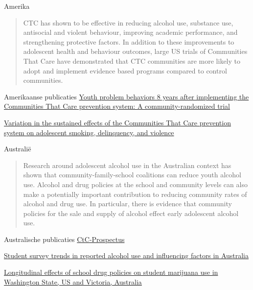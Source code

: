 \documentclass[
  ignorenonframetext,
]{beamer}
\begin{document}
\begin{frame}{Amerika}
\protect\hypertarget{amerika}{}
\begin{quote}
CTC has shown to be effective in reducing alcohol use, substance use,
antisocial and violent behaviour, improving academic performance, and
strengthening protective factors. In addition to these improvements to
adolescent health and behaviour outcomes, large US trials of Communities
That Care have demonstrated that CTC communities are more likely to
adopt and implement evidence based programs compared to control
communities.
\end{quote}
\end{frame}

\begin{frame}{Amerikaanse publicaties}
\protect\hypertarget{amerikaanse-publicaties}{}
\href{https://www.communitiesthatcare.org.au/sites/default/files/youth_problem_behaviors_8_years_after_implementing_the_communities_that_care_prevention_system_-_a_community-randomized_trial.pdf}{Youth
problem behaviors 8 years after implementing the Communities That Care
prevention system: A community-randomized trial}

\href{https://www.communitiesthatcare.org.au/sites/default/files/variation_in_the_sustained_effects_of_the_communities_that_care_prevention_system_on_adolescent_smoking_delinquency_and_violence.pdf}{Variation
in the sustained effects of the Communities That Care prevention system
on adolescent smoking, delinquency, and violence}
\end{frame}

\begin{frame}{Australië}
\protect\hypertarget{australiuxeb}{}
\begin{quote}
Research around adolescent alcohol use in the Australian context has
shown that community-family-school coalitions can reduce youth alcohol
use. Alcohol and drug policies at the school and community levels can
also make a potentially important contribution to reducing community
rates of alcohol and drug use. In particular, there is evidence that
community policies for the sale and supply of alcohol effect early
adolescent alcohol use.
\end{quote}
\end{frame}

\begin{frame}{Australische publicaties}
\protect\hypertarget{australische-publicaties}{}
\href{https://www.communitiesthatcare.org.au/sites/default/files/ctc_prospectus2022.pdf}{CtC-Prospectus}

\href{https://www.communitiesthatcare.org.au/sites/default/files/toumbourou_et_al_2018.pdf}{Student
survey trends in reported alcohol use and influencing factors in
Australia}

\href{https://www.communitiesthatcare.org.au/sites/default/files/longitudinal_effects_of_school_drug_policies_on_student_marijuana_use_in_washington_state_and_victoria_australia.pdf}{Longitudinal
effects of school drug policies on student marijuana use in Washington
State, US and Victoria, Australia}
\end{frame}
\end{document}
